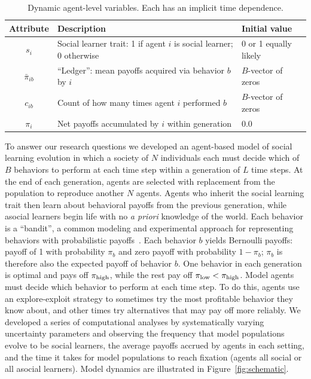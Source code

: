 \documentclass[letterpaper,11.5pt]{scrartcl}
\begin{document}
\begin{table}[h]
    \caption{Dynamic agent-level variables. Each has an implicit time dependence.}
    \label{tab:modelParameters}
    \centering %
    \begin{tabular}{cp{4.0in}p{1.25in}} \toprule

        Attribute & Description & Initial value \\ 

        \midrule  

        $s_i$  & Social learner trait: 1 if agent $i$ is social learner; 0 otherwise & 0
        or 1 equally likely \\

        $\bar\pi_{ib}$ & ``Ledger'': mean payoffs acquired via behavior $b$ by $i$ 
                       & $B$-vector of zeros \\

        $c_{ib}$ & Count of how many times agent $i$ performed $b$ 
              & $B$-vector of zeros \\

        $\pi_i$ & Net payoffs accumulated by $i$ within generation
                                & 0.0 \\
        \bottomrule
    \end{tabular}
\end{table}

To answer our research questions we developed an agent-based model of social
learning evolution in which a society of $N$ individuals each must decide which of
$B$ behaviors to perform at each time step within a generation of $L$ time steps. At
the end of each generation, agents are selected with replacement from the population
to reproduce another $N$ agents. Agents who inherit the social learning trait then
learn about behavioral payoffs from the previous generation, while asocial learners
begin life with no \emph{a priori} knowledge of the world.  Each behavior is a
``bandit'', a common modeling and experimental approach for representing behaviors
with probabilistic
payoffs~\cite{SuttonBartoBook,McElreath2005,Steyvers2009,Rendell2010,Schulz2019}.  Each behavior
$b$ yields Bernoulli payoffs: payoff of 1 with probability $\pi_b$ and zero payoff
with probability $1 - \pi_b$; $\pi_b$ is therefore also the expected payoff of
behavior $b$. One behavior in each generation is optimal and pays off $\pi_{\mathrm{high}}$,
while the rest pay off $\pi_{\mathrm{low}} < \pi_{\mathrm{high}}$.  Model agents must decide which behavior
to perform at each time step.  To do this, agents use an explore-exploit strategy to
sometimes try the most profitable behavior they know about, and other times try
alternatives that may pay off more reliably.  We developed a series of computational
analyses by systematically varying uncertainty parameters and observing the
frequency that model populations evolve to be social learners, the average payoffs
accrued by agents in each setting, and the time it takes for model populations to
reach fixation (agents all social or all asocial learners). Model dynamics are
illustrated in Figure~\ref{fig:schematic}.
\end{document}
